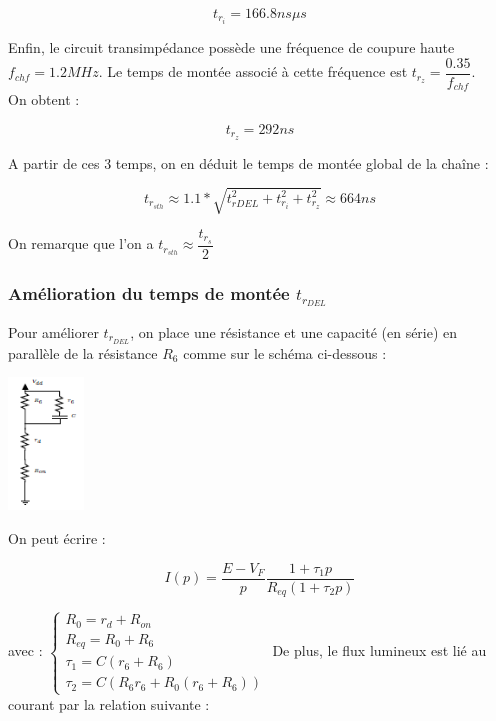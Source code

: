 \documentclass[a4paper]{report}
\begin{document}
$$t_{r_{i}} = 166.8 ns \mu s$$

Enfin, le circuit transimpédance possède une fréquence de coupure haute $f_{chf} = 1.2MHz$. Le temps de montée associé à cette fréquence est $t_{r_{z}} = \dfrac{0.35}{f_{chf}}$.\\

On obtent :

$$t_{r_{z}} = 292ns$$

A partir de ces 3 temps, on en déduit le temps de montée global de la chaîne :

$$t_{r_{sth}} \approx 1.1*\sqrt{t_{rDEL}^2 + t_{r_{i}}^2 + t_{r_{z}}^2} \approx 664ns$$

On remarque que l'on a $t_{r_{sth}} \approx \dfrac{t_{r_{s}}}{2}$

\subsubsection{Amélioration du temps de montée $t_{r_{DEL}}$}

Pour améliorer $t_{r_{DEL}}$, on place une résistance et une capacité (en série) en parallèle de la résistance $R_6$ comme sur le schéma ci-dessous :

\begin{center}
\includegraphics[width=0.15\textwidth]{montage_amelio_trdel.PNG}
\end{center}

On peut écrire :

$$I(p) = \dfrac{E-V_F}{p}\dfrac{1+\tau_1p}{R_{eq}(1+\tau_2p)}$$

avec :
\newline
\newline
$\left\{
\begin{array}{l}
  R_0 = r_d + R_{on}\\
  R_{eq} = R_0 + R_6\\
  \tau_1 = C(r_6+R_6)\\
  \tau_2 = C(R_6r_6 + R_0(r_6+R_6))
\end{array}
\right.$
\newline
\newline
De plus, le flux lumineux est lié au courant par la relation suivante : 
\end{document}
